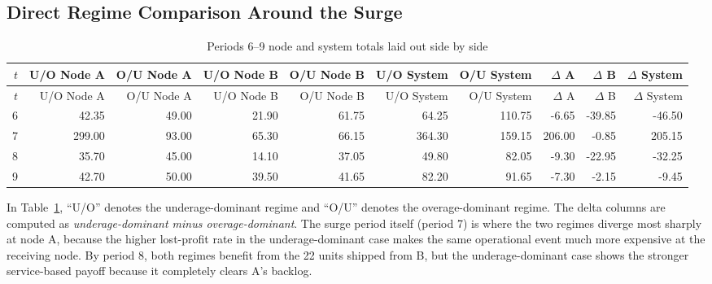 \documentclass[11pt]{article}
\begin{document}
\begin{landscape}
\subsection{Direct Regime Comparison Around the Surge}
\begin{longtable}{rrrrrrrrrr}
\caption{Periods 6--9 node and system totals laid out side by side}\label{tab:appendix-regime-delta}\\
\toprule
$t$ & U/O Node A & O/U Node A & U/O Node B & O/U Node B & U/O System & O/U System & $\Delta$ A & $\Delta$ B & $\Delta$ System \\
\midrule
\endfirsthead
\toprule
$t$ & U/O Node A & O/U Node A & U/O Node B & O/U Node B & U/O System & O/U System & $\Delta$ A & $\Delta$ B & $\Delta$ System \\
\midrule
\endhead
6 & 42.35 & 49.00 & 21.90 & 61.75 & 64.25 & 110.75 & -6.65 & -39.85 & -46.50 \\
7 & 299.00 & 93.00 & 65.30 & 66.15 & 364.30 & 159.15 & 206.00 & -0.85 & 205.15 \\
8 & 35.70 & 45.00 & 14.10 & 37.05 & 49.80 & 82.05 & -9.30 & -22.95 & -32.25 \\
9 & 42.70 & 50.00 & 39.50 & 41.65 & 82.20 & 91.65 & -7.30 & -2.15 & -9.45 \\
\bottomrule
\end{longtable}

In Table~\ref{tab:appendix-regime-delta}, ``U/O'' denotes the underage-dominant regime and ``O/U'' denotes the overage-dominant regime. The delta columns are computed as \emph{underage-dominant minus overage-dominant}. The surge period itself (period 7) is where the two regimes diverge most sharply at node A, because the higher lost-profit rate in the underage-dominant case makes the same operational event much more expensive at the receiving node. By period 8, both regimes benefit from the 22 units shipped from B, but the underage-dominant case shows the stronger service-based payoff because it completely clears A's backlog.

\end{landscape}
\end{document}
